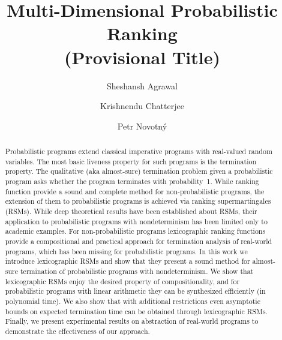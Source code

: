 \documentclass[acmsmall, anonymous]{acmart}
\begin{document}

\title{Multi-Dimensional Probabilistic Ranking \\ (Provisional Title)}

\author{Sheshansh Agrawal}

\author{Krishnendu Chatterjee}

\author{Petr Novotn\'{y}}

\begin{abstract}
Probabilistic programs extend classical imperative programs with 
real-valued random variables.
The most basic liveness property for such programs is the termination 
property.
The qualitative (aka almost-sure) termination problem given a probabilistic program
asks whether the program terminates with probability~1.
While ranking function provide a sound and complete method for non-probabilistic
programs, the extension of them to probabilistic programs is achieved
via ranking supermartingales (RSMs). 
While deep theoretical results have been established about RSMs, 
their application to probabilistic programs with nondeterminism has been limited
only to academic examples. 
For non-probabilistic programs lexicographic ranking functions provide a compositional
and practical approach for termination analysis of real-world programs, 
which has been missing for probabilistic programs. 
In this work we introduce lexicographic RSMs and show that they present a sound
method for almost-sure termination of probabilistic programs with nondeterminism.
We show that lexicographic RSMs enjoy the desired property of compositionality,
and for probabilistic programs with linear arithmetic they can be synthesized 
efficiently (in polynomial time).
We also show that with additional restrictions even asymptotic bounds on expected
termination time can be obtained through lexicographic RSMs.
Finally, we present experimental results on abstraction of real-world programs
to demonstrate the effectiveness of our approach.
\end{abstract}



\maketitle
\end{document}
